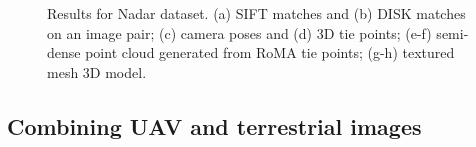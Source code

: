 \begin{figure}
{  } \qquad
   \qquad
  \caption{Results for Nadar dataset. (a) SIFT matches and (b) DISK matches on an image pair; (c) camera poses and (d) 3D tie points; (e-f) semi-dense point cloud generated from RoMA tie points; (g-h) textured mesh 3D model.}
  \label{fig:5:res_nadar}
\end{figure}

\subsection{Combining UAV and terrestrial images}

